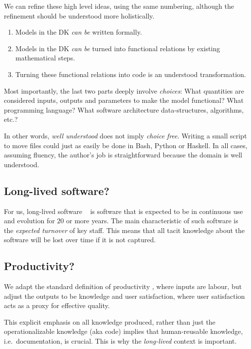 \documentclass[a4paper,UKenglish,cleveref,autoref,thm-restate]{oasics-v2021}
\begin{document}
We can refine these high level ideas, using the same numbering, although the
refinement should be understood more holistically.
\begin{enumerate}
\item Models in the DK \emph{can be} written formally.
\item Models in the DK \emph{can be} turned into functional relations by
 existing mathematical steps.
\item Turning these functional relations into code is an understood
 transformation.
\end{enumerate}
Most importantly, the last two parts deeply involve \emph{choices}: What
quantities are considered inputs, outputs and parameters to make the model
functional? What programming language?  What software architecture
data-structures, algorithms, etc.?

In other words, \emph{well understood} does not imply \emph{choice free}.
Writing a small script to move files could just as easily be done in Bash,
Python or Haskell. In all cases, assuming fluency, the author's job is
straightforward because the domain is well understood.

\subsection{Long-lived software?}
\label{subsec:long-lived-software}

For us, long-lived software ~\cite{SPL-long-lived} is software that is expected
to be in continuous use and evolution for $20$ or more years. The main
characteristic of such software is the \emph{expected turnover} of key staff.
This means that all tacit knowledge about the software will be lost over time if
it is not captured.

\subsection{Productivity?}
\label{subsec:productivity}

We adapt the standard definition of productivity \cite{Boehm1987}, where inputs
are labour, but adjust the outputs to be knowledge and user satisfaction, where
user satisfaction acts as a proxy for effective quality.

This explicit emphasis on all knowledge produced, rather than just the
operationalizable knowledge (aka code) implies that human-reusable knowledge,
i.e.\ documentation, is crucial. This is why the \emph{long-lived} context is
important.
\end{document}
